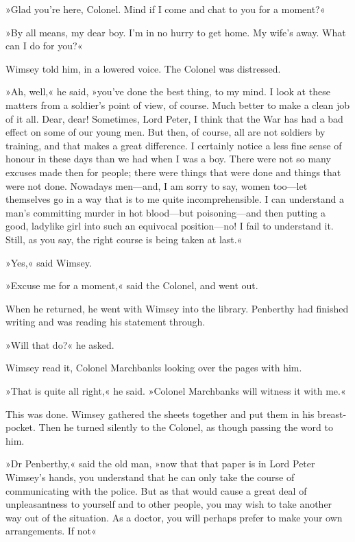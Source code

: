 »Glad you're here, Colonel. Mind if I come and chat to you for a moment?«

»By all means, my dear boy. I'm in no hurry to get home. My wife's away. What can I do for you?«

Wimsey told him, in a lowered voice. The Colonel was distressed.

»Ah, well,« he said, »you've done the best thing, to my mind. I look at these matters from a soldier's point of view, of course. Much better to make a clean job of it all. Dear, dear! Sometimes, Lord Peter, I think that the War has had a bad effect on some of our young men. But then, of course, all are not soldiers by training, and that makes a great difference. I certainly notice a less fine sense of honour in these days than we had when I was a boy. There were not so many excuses made then for people; there were things that were done and things that were not done. Nowadays men\allowbreak---\allowbreak and, I am sorry to say, women too\allowbreak---\allowbreak let themselves go in a way that is to me quite incomprehensible. I can understand a man's committing murder in hot blood\allowbreak---\allowbreak but poisoning\allowbreak---\allowbreak and then putting a good, ladylike girl into such an equivocal position\allowbreak---\allowbreak no! I fail to understand it. Still, as you say, the right course is being taken at last.«

»Yes,« said Wimsey.

»Excuse me for a moment,« said the Colonel, and went out.

When he returned, he went with Wimsey into the library. Penberthy had finished writing and was reading his statement through.

»Will that do?« he asked.

Wimsey read it, Colonel Marchbanks looking over the pages with him.

»That is quite all right,« he said. »Colonel Marchbanks will witness it with me.«

This was done. Wimsey gathered the sheets together and put them in his breast-pocket. Then he turned silently to the Colonel, as though passing the word to him.

»Dr Penberthy,« said the old man, »now that that paper is in Lord Peter Wimsey's hands, you understand that he can only take the course of communicating with the police. But as that would cause a great deal of unpleasantness to yourself and to other people, you may wish to take another way out of the situation. As a doctor, you will perhaps prefer to make your own arrangements. If not\longdash«

